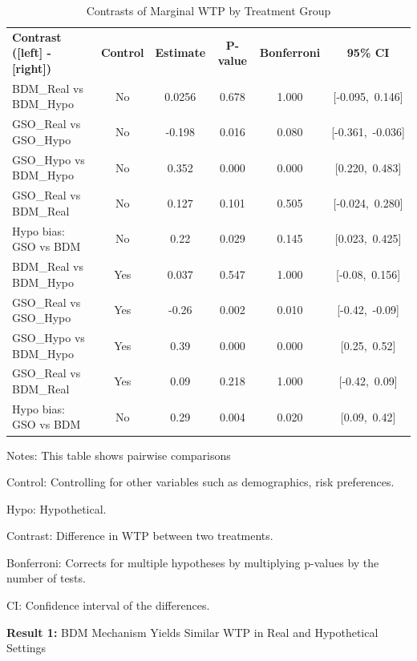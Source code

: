 \documentclass[12pt]{article}
\begin{document}
\begin{table}[htbp]
\centering
\footnotesize
\caption{Contrasts of Marginal WTP by Treatment Group}
\label{tab: Regression}
\begin{tabular}{lccccc}
\textbf{Contrast ([left] - [right])} & \textbf{Control} & \textbf{Estimate} & \textbf{P-value} & \textbf{Bonferroni} & \textbf{95\% CI} \\

BDM\_Real vs BDM\_Hypo & No & 0.0256 & 0.678 & 1.000 & [-0.095,\ 0.146] \\
GSO\_Real vs GSO\_Hypo & No & -0.198 & 0.016 & 0.080 & [-0.361,\ -0.036] \\
GSO\_Hypo vs BDM\_Hypo & No & 0.352 & 0.000 & 0.000 & [0.220,\ 0.483] \\
GSO\_Real vs BDM\_Real & No & 0.127 & 0.101 & 0.505 & [-0.024,\ 0.280] \\
Hypo bias: GSO vs BDM & No & 0.22 & 0.029 & 0.145 & [0.023,\ 0.425] \\
BDM\_Real vs BDM\_Hypo & Yes & 0.037 & 0.547 & 1.000 & [-0.08,\ 0.156] \\
GSO\_Real vs GSO\_Hypo & Yes & -0.26 & 0.002 & 0.010 & [-0.42,\ -0.09] \\
GSO\_Hypo vs BDM\_Hypo & Yes & 0.39 & 0.000 & 0.000 & [0.25,\ 0.52] \\
GSO\_Real vs BDM\_Real & Yes & 0.09 & 0.218 & 1.000 & [-0.42,\ 0.09] \\
Hypo bias: GSO vs BDM & No & 0.29 & 0.004 & 0.020 & [0.09,\ 0.42] \\
\end{tabular}
\begin{tablenotes}
\footnotesize
\item Notes: This table shows pairwise comparisons 
\item Control: Controlling for other variables such as demographics, risk preferences.
\item Hypo: Hypothetical.
\item Contrast: Difference in WTP between two treatments.
\item Bonferroni: Corrects for multiple hypotheses by multiplying p-values by the number of tests.
\item CI: Confidence interval of the differences.
\end{tablenotes}
\end{table}



\textbf{Result 1:} BDM Mechanism Yields Similar WTP in Real and Hypothetical Settings 
\end{document}

